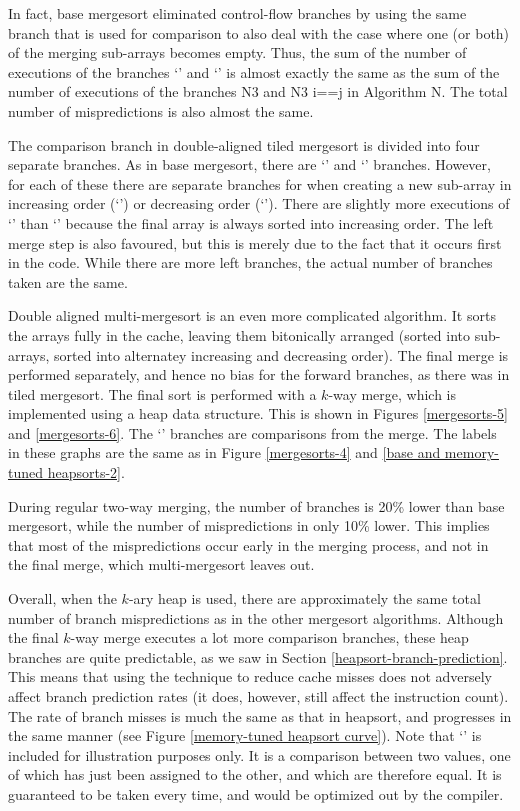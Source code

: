 In fact, base mergesort eliminated control-flow branches by using the same
branch that is used for comparison to also deal with the case where one (or
both) of the merging sub-arrays becomes empty. Thus, the sum of the number of
executions of the branches `' and `' is almost exactly the same
as the sum of the number of executions of the branches N3 and N3 i==j in
Algorithm N. The total number of mispredictions is also almost the same.

The comparison branch in double-aligned tiled mergesort is divided into four
separate branches. As in base mergesort, there are `' and `'
branches. However, for each of these there are separate branches for when
creating a new sub-array in increasing order (`') or decreasing
order (`'). There are slightly more executions of `' than
`' because the final array is always sorted into increasing order.
The left merge step is also favoured, but this is merely due to the fact that it
occurs first in the code. While there are more left branches, the actual number
of branches taken are the same.

Double aligned multi-mergesort is an even more complicated algorithm. It sorts
the arrays fully in the cache, leaving them bitonically arranged (sorted into
sub-arrays, sorted into alternatey increasing and decreasing order). The final
merge is performed separately, and hence no bias for the forward branches, as
there was in tiled mergesort. The final sort is performed with a $k$-way merge,
which is implemented using a heap data structure. This is shown in Figures
\ref{mergesorts-5} and \ref{mergesorts-6}. The `' branches are
comparisons from the merge. The labels in these graphs are the same as in Figure
\ref{mergesorts-4} and \ref{base and memory-tuned heapsorts-2}.

During regular two-way merging, the number of branches is 20\% lower than base
mergesort, while the number of mispredictions in only 10\% lower. This implies
that most of the mispredictions occur early in the merging process, and not in
the final merge, which multi-mergesort leaves out.

Overall, when the $k$-ary heap is used, there are approximately the same total
number of branch mispredictions as in the other mergesort algorithms. Although
the final $k$-way merge executes a lot more comparison branches, these heap
branches are quite predictable, as we saw in Section
\ref{heapsort-branch-prediction}. This means that using the technique to reduce
cache misses does not adversely affect branch prediction rates (it does,
however, still affect the instruction count). The rate of branch misses is much
the same as that in heapsort, and progresses in the same manner (see Figure
\ref{memory-tuned heapsort curve}). Note that `' is included for
illustration purposes only. It is a comparison between two values, one of which
has just been assigned to the other, and which are therefore equal. It is
guaranteed to be taken every time, and would be optimized out by the compiler. 


